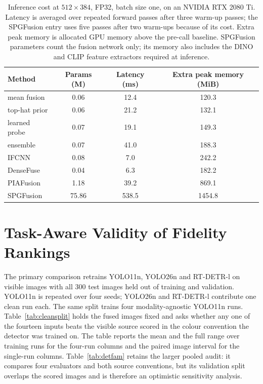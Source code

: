 \documentclass[journal]{IEEEtran}
\begin{document}
\begin{sloppypar}
\begin{table}[!t]
\caption{Inference cost at $512\times384$, FP32, batch size one, on an NVIDIA
RTX 2080 Ti. Latency is averaged over repeated forward passes after three warm-up passes;
the SPGFusion entry uses five passes after two warm-ups because of its cost. Extra peak
memory is allocated GPU memory above the pre-call baseline. SPGFusion parameters count
the fusion network only; its memory also includes the DINO and CLIP feature extractors
required at inference.}\label{tab:cost}
\setlength{\tabcolsep}{4pt}
\begin{tabular*}{\linewidth}{@{\extracolsep{\fill}}l SSS@{}}
\toprule
Method & {Params (M)} & {Latency (ms)} & {Extra peak memory (MiB)}\\
\midrule
mean fusion & 0.06 & 12.4 & 120.3\\
top-hat prior & 0.06 & 21.2 & 132.1\\
learned probe & 0.07 & 19.1 & 149.3\\
ensemble & 0.07 & 41.0 & 188.3\\
IFCNN~\cite{zhang2020} & 0.08 & 7.0 & 242.2\\
DenseFuse~\cite{li2019} & 0.04 & 6.3 & 182.2\\
PIAFusion~\cite{tang2022} & 1.18 & 39.2 & 869.1\\
SPGFusion~\cite{zhang2026} & 75.86 & 538.5 & 1454.8\\
\bottomrule
\end{tabular*}

\end{table}
\end{sloppypar}

\section{Task-Aware Validity of Fidelity Rankings}
\label{sec:detect}

The primary comparison retrains YOLO11n, YOLO26n and RT-DETR-l on visible images with
all 300 test images held out of training and validation. YOLO11n is repeated over four
seeds; YOLO26n and RT-DETR-l contribute one clean run each. The same split trains four
modality-agnostic YOLO11n runs. Table~\ref{tab:cleansplit} holds the fused images fixed
and asks whether any one of the fourteen inputs beats the visible source scored in the
colour convention the detector was trained on. The table reports the mean and the full
range over training runs for the four-run columns and the paired image interval for
the single-run columns. Table~\ref{tab:detfam} retains the larger pooled audit: it compares four
evaluators and both source conventions, but its validation split overlaps the scored
images and is therefore an optimistic sensitivity analysis.
\end{document}
